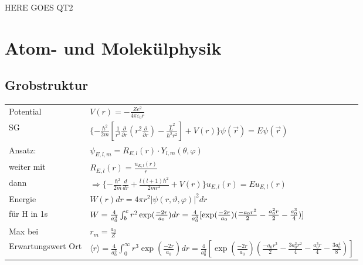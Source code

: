 \documentclass[12pt,a4paper]{article}
\renewcommand{\d}[2]{\frac{d #1}{d #2}}
\newcommand{\pd}[2]{\frac{\partial #1}{\partial #2}}
\renewcommand{\=}[1]{\stackrel{#1}{=}}
\newcommand{\ort}{\vec r}
\theoremstyle{definition}
\theoremstyle{remark}
\begin{document}
HERE GOES QT2\\






\section{Atom- und Molekülphysik}
\subsection{Grobstruktur}

\begin{center}
\begin{minipage}[t]{.35\linewidth}
\vspace{0pt}
\noindent\begin{tabular}{ll}
\toprule
Potential & $V(r) = -\frac{Ze^2}{4\pi \varepsilon_0 r}$\\
SG & $\{-\frac{\hbar^2}{2m} [\frac{1}{r^2} \pd{}{r} (r^2 \pd{}{r}) - \frac{\hat L^2}{\hbar^2 r^2}] + V(r) \} \psi(\ort) = E \psi(\ort)$\\
Ansatz: & $\psi_{E, l, m} = R_{E, l}(r) \cdot Y_{l,m} (\theta, \varphi)$\\
weiter mit & $R_{E, l}(r) = \frac{u_{E, l}(r)}{r}$\\
dann & $\Rightarrow \{-\frac{\hbar^2}{2m} \d{}{r} + \frac{l(l+1)\hbar^2}{2mr^2} + V(r)\} u_{E, l}(r) = E u_{E, l}(r)$\\
Energie & $W(r) dr = 4\pi r^2 |\psi (r, \vartheta, \varphi) |^2 dr$\\
für H in 1s & $W = \frac{4}{a_0^3} \int_b^c r^2 \exp(\frac{-2r}{a_0})dr = \\ \frac{4}{a_0^3} [\exp(\frac{-2r}{a_0})(\frac{-a_0 r^2}{2} - \frac{a_0^2 r}{2} - \frac{a_0^3}{4})]$\\
Max bei & $r_m = \frac{a_0}{Z}$\\
Erwartungswert Ort & $\langle r \rangle = \frac{4}{a_0^3}\int_0^{\infty} r^3 \exp (\frac{-2r}{a_0}) dr = \frac{4}{a_0^3}[\exp(\frac{-2r}{a_0})(\frac{-a_0 r^3}{2} - \frac{3a_0^2 r^2}{4} - \frac{a_0^3 r}{4} - \frac{3a_0^4}{8})]$\\
\bottomrule
\end{tabular}
\end{minipage}%
\begin{minipage}[t]{.65\linewidth}
\vspace{0pt}
\begin{tabular}{ll}
\toprule


\end{tabular}
\end{minipage}
\end{center}
\end{document}
